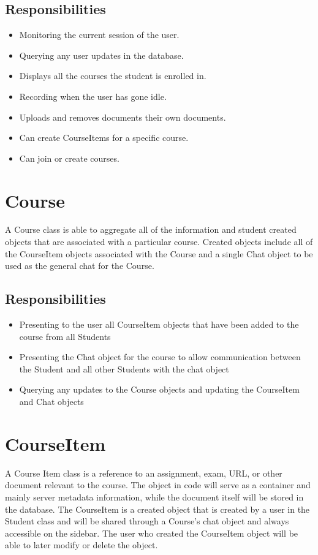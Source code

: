 \documentclass[16pt]{scrreprt}
\begin{document}
\subsection{Responsibilities}
\begin{itemize}
	\item Monitoring the current session of the user.
	\item Querying any user updates in the database. 
	\item Displays all the courses the student is enrolled in. 
	\item Recording when the user has gone idle. 
	\item Uploads and removes documents their own documents.
	\item Can create CourseItems for a specific course.
	\item Can join or create courses.
\end{itemize}

\section{Course}
A Course class is able to aggregate all of the information and student created objects that are associated with a particular course. Created objects include all of the CourseItem objects associated with the Course and a single Chat object to be used as the general chat for the Course.
\subsection{Responsibilities}
\begin{itemize}
	\item Presenting to the user all CourseItem objects that have been added to the course from all Students 
	\item Presenting the Chat object for the course to allow communication between the Student and all other Students with the chat object
	\item Querying any updates to the Course objects and updating the CourseItem and Chat objects
\end{itemize}

\section{CourseItem}
A Course Item class is a reference to an assignment, exam, URL, or other document relevant to the course. The object in code will serve as a container and mainly server metadata information, while the document itself will be stored in the database. The CourseItem is a created object that is created by a user in the Student class and will be shared through a Course’s chat object and always accessible on the sidebar. The user who created the CourseItem object will be able to later modify or delete the object.
\end{document}

